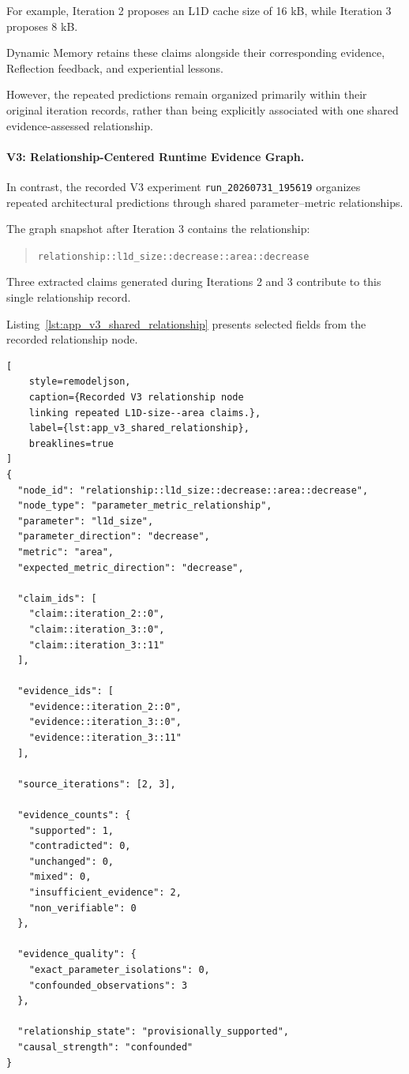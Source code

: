 For example, Iteration 2 proposes an
L1D cache size of 16 kB, while
Iteration 3 proposes 8 kB.

Dynamic Memory retains these claims
alongside their corresponding evidence,
Reflection feedback, and experiential
lessons.

However, the repeated predictions
remain organized primarily within
their original iteration records,
rather than being explicitly associated
with one shared evidence-assessed
relationship.



\paragraph{V3: Relationship-Centered Runtime Evidence Graph.}

In contrast, the recorded V3 experiment
\texttt{run\_20260731\_195619}
organizes repeated architectural
predictions through shared
parameter--metric relationships.

The graph snapshot after Iteration 3
contains the relationship:

\begin{quote}
\texttt{relationship::l1d\_size::decrease::area::decrease}
\end{quote}

Three extracted claims generated during
Iterations 2 and 3 contribute to this
single relationship record.

Listing~\ref{lst:app_v3_shared_relationship}
presents selected fields from the
recorded relationship node.

\begin{lstlisting}[
    style=remodeljson,
    caption={Recorded V3 relationship node
    linking repeated L1D-size--area claims.},
    label={lst:app_v3_shared_relationship},
    breaklines=true
]
{
  "node_id": "relationship::l1d_size::decrease::area::decrease",
  "node_type": "parameter_metric_relationship",
  "parameter": "l1d_size",
  "parameter_direction": "decrease",
  "metric": "area",
  "expected_metric_direction": "decrease",

  "claim_ids": [
    "claim::iteration_2::0",
    "claim::iteration_3::0",
    "claim::iteration_3::11"
  ],

  "evidence_ids": [
    "evidence::iteration_2::0",
    "evidence::iteration_3::0",
    "evidence::iteration_3::11"
  ],

  "source_iterations": [2, 3],

  "evidence_counts": {
    "supported": 1,
    "contradicted": 0,
    "unchanged": 0,
    "mixed": 0,
    "insufficient_evidence": 2,
    "non_verifiable": 0
  },

  "evidence_quality": {
    "exact_parameter_isolations": 0,
    "confounded_observations": 3
  },

  "relationship_state": "provisionally_supported",
  "causal_strength": "confounded"
}
\end{lstlisting}

